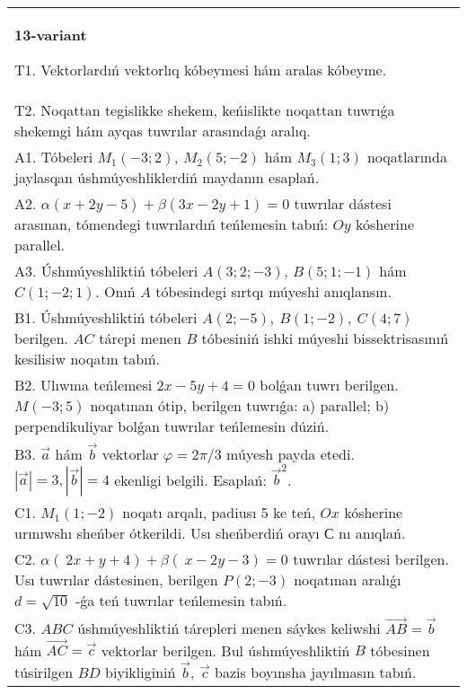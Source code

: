 \documentclass{article}
\begin{document}
\begin{tabular}{m{17cm}}
\textbf{13-variant}
\newline

T1. 
Vektorlardıń vektorlıq kóbeymesi hám aralas kóbeyme.
 \\
T2. 
Noqattan tegislikke shekem, keńislikte noqattan tuwrıǵa shekemgi hám ayqas tuwrılar arasındaǵı aralıq. \\
A1. 
Tóbeleri $M_1(-3;2)$, $M_2(5;-2)$ hám $M_3(1;3)$ 
noqatlarında jaylasqan úshmúyeshliklerdiń maydanın esaplań.
 \\
A2. 
$\alpha(x+2y-5)+\beta(3x-2y+1)=0$ tuwrılar
dástesi arasınan, tómendegi tuwrılardıń teńlemesin tabıń:
$Oy$ kósherine parallel.
 \\
A3. 
Úshmúyeshliktiń tóbeleri
$A (3;2; - 3) $, $B (5;1; - 1)$ hám $C (1; - 2;1) $. Onıń $A$ tóbesindegi sırtqı múyeshi anıqlansın. 
 \\
B1. 
Úshmúyeshliktiń tóbeleri \(A(2;-5),\ B(1;-2),\ C(4;7)\)
berilgen. $AC$ tárepi menen $B$ tóbesiniń ishki múyeshi
bissektrisasınıń kesilisiw noqatın tabıń.
 \\
B2. 
Ulıwma teńlemesi \(2x-5y+4=0\) bolǵan tuwrı
berilgen. \(M(-3;5)\) noqatınan ótip, berilgen tuwrıǵa: a) parallel;
b) perpendikuliyar bolǵan tuwrılar teńlemesin dúziń.
 \\
B3. 
$\vec{a}$ hám $\vec{b}$ vektorlar $\varphi = 2\pi/3$ múyesh payda etedi. $|\vec{a}| = 3,|\vec{b}| = 4$ ekenligi belgili. Esaplań: 
${\vec{b}}^{2}$.
 \\
C1. 
\(M_{1}(1; - 2)\) noqatı arqalı, padiusı 5 ke teń,
$Ox$ kósherine urınıwshı sheńber ótkerildi. Usı sheńberdiń orayı
$С$ nı anıqlań.
 \\
C2. 
\(\alpha (\ 2x + y + 4) + \beta(\ x - 2y - 3) = 0\) 
tuwrılar dástesi berilgen. Usı tuwrılar dástesinen, berilgen
\(P(2; - 3)\) noqatınan aralıǵı \(d = \sqrt{10}\) -ǵa teń tuwrılar
teńlemesin tabıń.
 \\
C3. 
\(ABC\) úshmúyeshliktiń tárepleri menen sáykes keliwshi \(\vec{AB} = \vec{b}\) hám \(\vec{AC} = \vec{c}\) vektorlar berilgen. Bul úshmúyeshliktiń \(B\) tóbesinen túsirilgen \(BD\) biyikliginiń \(\vec{b},\ \vec{c}\) bazis boyınsha jayılmasın tabıń.
 \\

\end{tabular}
\vspace{1cm}
\end{document}
